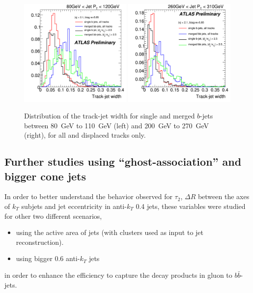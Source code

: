\begin{figure}[tp]
\centering
\includegraphics[width=0.49\textwidth]{FIGS/TEMPFigs/DisplacedTracks/trkWidth_singlemerged_AllandDisplaced_80-120.pdf}
\includegraphics[width=0.49\textwidth]{FIGS/TEMPFigs/DisplacedTracks/trkWidth_singlemerged_AllandDisplaced_260-310.pdf}
\caption{Distribution of the track-jet width for single and merged $b$-jets between 80~GeV to 110~GeV (left) and 200~GeV to 270~GeV (right), for all and displaced tracks only.}
\label{fig:displacedtrkwidth}
\end{figure}


\subsection{Further studies using ``ghost-association'' and bigger cone jets}

In order to better understand the behavior observed for $\tau_2$, $\Delta R$ between the axes of $k_T$ subjets and jet eccentricity in anti-$k_T$ 0.4 jets, these variables were studied for other two different scenarios,

\begin{itemize}\addtolength{\itemsep}{-0.4\baselineskip}
\item 
using the active area of jets (with clusters used as input to jet reconstruction).
\item
using bigger 0.6 anti-$k_T$ jets
\end{itemize}
%
in order to enhance the efficiency to capture the decay products in gluon to $b \bar{b}$-jets.

